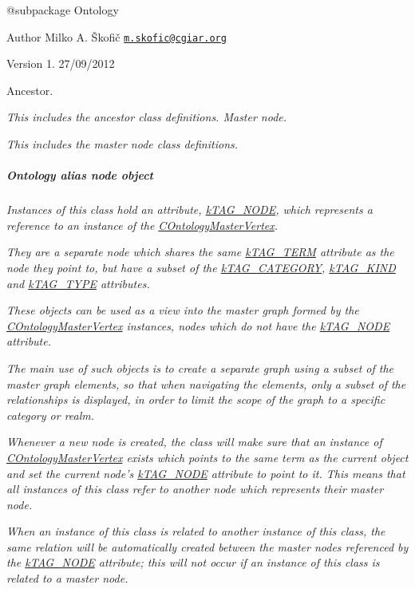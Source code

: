 {\itshape \begin{DoxyVerb} @subpackage        Ontology
\end{DoxyVerb}
}

{\itshape \begin{DoxyAuthor}{Author}
Milko A. Škofič \href{mailto:m.skofic@cgiar.org}{\tt m.\-skofic@cgiar.\-org} 
\end{DoxyAuthor}
\begin{DoxyVersion}{Version}
1. 27/09/2012
\end{DoxyVersion}
Ancestor.}

{\itshape This includes the ancestor class definitions. Master node.}

{\itshape This includes the master node class definitions. \subparagraph*{Ontology alias node object}}

{\itshape }

{\itshape Instances of this class hold an attribute, \hyperlink{}{k\-T\-A\-G\-\_\-\-N\-O\-D\-E}, which represents a reference to an instance of the \hyperlink{class_c_ontology_master_vertex}{C\-Ontology\-Master\-Vertex}.}

{\itshape They are a separate node which shares the same \hyperlink{}{k\-T\-A\-G\-\_\-\-T\-E\-R\-M} attribute as the node they point to, but have a subset of the \hyperlink{}{k\-T\-A\-G\-\_\-\-C\-A\-T\-E\-G\-O\-R\-Y}, \hyperlink{}{k\-T\-A\-G\-\_\-\-K\-I\-N\-D} and \hyperlink{}{k\-T\-A\-G\-\_\-\-T\-Y\-P\-E} attributes.}

{\itshape These objects can be used as a view into the master graph formed by the \hyperlink{class_c_ontology_master_vertex}{C\-Ontology\-Master\-Vertex} instances, nodes which do not have the \hyperlink{}{k\-T\-A\-G\-\_\-\-N\-O\-D\-E} attribute.}

{\itshape The main use of such objects is to create a separate graph using a subset of the master graph elements, so that when navigating the elements, only a subset of the relationships is displayed, in order to limit the scope of the graph to a specific category or realm.}

{\itshape Whenever a new node is created, the class will make sure that an instance of \hyperlink{class_c_ontology_master_vertex}{C\-Ontology\-Master\-Vertex} exists which points to the same term as the current object and set the current node's \hyperlink{}{k\-T\-A\-G\-\_\-\-N\-O\-D\-E} attribute to point to it. This means that all instances of this class refer to another node which represents their master node.}

{\itshape When an instance of this class is related to another instance of this class, the same relation will be automatically created between the master nodes referenced by the \hyperlink{}{k\-T\-A\-G\-\_\-\-N\-O\-D\-E} attribute; this will not occur if an instance of this class is related to a master node.}

